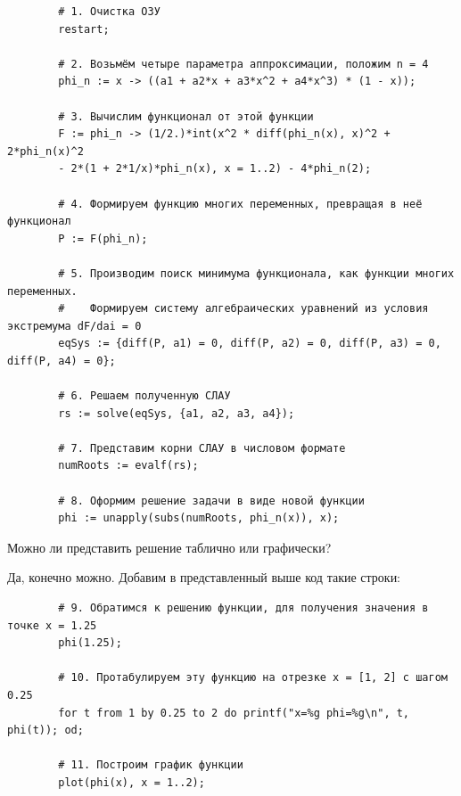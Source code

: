 \documentclass{article}
\begin{document}
\begin{commandline}
	\begin{verbatim}
		# 1. Очистка ОЗУ
		restart;		
		
		# 2. Возьмём четыре параметра аппроксимации, положим n = 4
		phi_n := x -> ((a1 + a2*x + a3*x^2 + a4*x^3) * (1 - x));	
		
		# 3. Вычислим функционал от этой функции
		F := phi_n -> (1/2.)*int(x^2 * diff(phi_n(x), x)^2 + 2*phi_n(x)^2
		- 2*(1 + 2*1/x)*phi_n(x), x = 1..2) - 4*phi_n(2);
		
		# 4. Формируем функцию многих переменных, превращая в неё функционал
		P := F(phi_n);	
		
		# 5. Производим поиск минимума функционала, как функции многих переменных.
		#    Формируем систему алгебраических уравнений из условия экстремума dF/dai = 0
		eqSys := {diff(P, a1) = 0, diff(P, a2) = 0, diff(P, a3) = 0, diff(P, a4) = 0};
		
		# 6. Решаем полученную СЛАУ
		rs := solve(eqSys, {a1, a2, a3, a4});
		
		# 7. Представим корни СЛАУ в числовом формате
		numRoots := evalf(rs);
		
		# 8. Оформим решение задачи в виде новой функции
		phi := unapply(subs(numRoots, phi_n(x)), x);
	\end{verbatim}
\end{commandline}

\newpage
\begin{question}
	Можно ли представить решение таблично или графически?
\end{question}

Да, конечно можно. Добавим в представленный выше код такие строки:

\begin{commandline}
	\begin{verbatim}
		# 9. Обратимся к решению функции, для получения значения в точке x = 1.25
		phi(1.25);
		
		# 10. Протабулируем эту функцию на отрезке x = [1, 2] с шагом 0.25
		for t from 1 by 0.25 to 2 do printf("x=%g phi=%g\n", t, phi(t)); od;
		
		# 11. Построим график функции
		plot(phi(x), x = 1..2);
	\end{verbatim}
\end{commandline}
\end{document}
